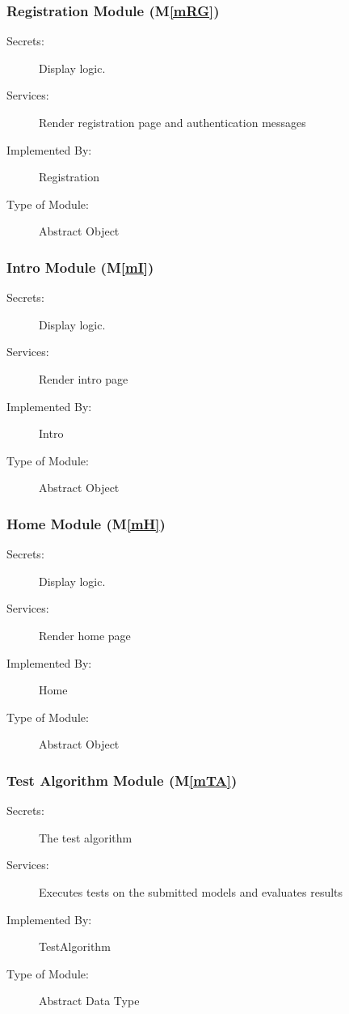 \documentclass[12pt, titlepage]{article}
\newcommand{\mref}[1]{M\ref{#1}}
\begin{document}
\subsubsection{Registration Module (\mref{mRG})}

\begin{description}
\item[Secrets:] Display logic.
\item[Services:] Render registration page and authentication messages
\item[Implemented By:] Registration
\item[Type of Module:] Abstract Object
\end{description}

\subsubsection{Intro Module (\mref{mI})}

\begin{description}
\item[Secrets:] Display logic.
\item[Services:] Render intro page
\item[Implemented By:] Intro
\item[Type of Module:] Abstract Object
\end{description}

\subsubsection{Home Module (\mref{mH})}

\begin{description}
\item[Secrets:] Display logic.
\item[Services:] Render home page
\item[Implemented By:] Home
\item[Type of Module:] Abstract Object
\end{description}

\subsubsection{Test Algorithm Module (\mref{mTA})}

\begin{description}
\item[Secrets:] The test algorithm
\item[Services:] Executes tests on the submitted models and evaluates results
\item[Implemented By:] TestAlgorithm
\item[Type of Module:] Abstract Data Type
\end{description}
\end{document}
